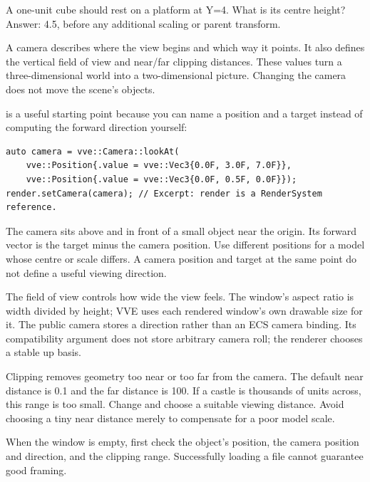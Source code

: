 \documentclass[11pt,a4paper]{article}
\begin{document}
\begin{tryit}A one-unit cube should rest on a platform at Y=4. What is its centre height? Answer: 4.5, before any additional scaling or parent transform.\end{tryit}

A camera describes where the view begins and which way it points. It also defines the vertical field of view and near/far clipping distances. These values turn a three-dimensional world into a two-dimensional picture. Changing the camera does not move the scene's objects.

 is a useful starting point because you can name a position and a target instead of computing the forward direction yourself:
\begin{lstlisting}
auto camera = vve::Camera::lookAt(
    vve::Position{.value = vve::Vec3{0.0F, 3.0F, 7.0F}},
    vve::Position{.value = vve::Vec3{0.0F, 0.5F, 0.0F}});
render.setCamera(camera); // Excerpt: render is a RenderSystem reference.
\end{lstlisting}
The camera sits above and in front of a small object near the origin. Its forward vector is the target minus the camera position. Use different positions for a model whose centre or scale differs. A camera position and target at the same point do not define a useful viewing direction.

The field of view controls how wide the view feels. The window's aspect ratio is width divided by height; VVE uses each rendered window's own drawable size for it. The public camera stores a direction rather than an ECS camera binding. Its compatibility  argument does not store arbitrary camera roll; the renderer chooses a stable up basis.

Clipping removes geometry too near or too far from the camera. The default near distance is 0.1 and the far distance is 100. If a castle is thousands of units across, this range is too small. Change  and choose a suitable viewing distance. Avoid choosing a tiny near distance merely to compensate for a poor model scale.

\begin{remember}When the window is empty, first check the object's position, the camera position and direction, and the clipping range. Successfully loading a file cannot guarantee good framing.\end{remember}
\end{document}
